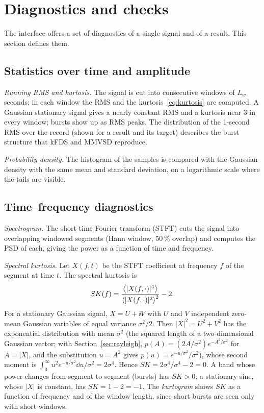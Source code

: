 \section{Diagnostics and checks}\label{sec:diagnostics}

The interface offers a set of diagnostics of a single signal and of a result. This section defines
them.

\subsection{Statistics over time and amplitude}

\emph{Running RMS and kurtosis.} The signal is cut into consecutive windows of $L_w$ seconds; in each
window the RMS and the kurtosis~\eqref{eq:kurtosis} are computed. A Gaussian stationary signal gives a
nearly constant RMS and a kurtosis near 3 in every window; bursts show up as RMS peaks. The
distribution of the 1-second RMS over the record (shown for a result and its target) describes the
burst structure that kFDS and MMVSD reproduce.

\emph{Probability density.} The histogram of the samples is compared with the Gaussian density with
the same mean and standard deviation, on a logarithmic scale where the tails are visible.

\subsection{Time--frequency diagnostics}

\emph{Spectrogram.} The short-time Fourier transform (STFT) cuts the signal into overlapping
windowed segments (Hann window, 50\,\% overlap) and computes the PSD of each, giving the power as a
function of time and frequency.

\emph{Spectral kurtosis.} Let $X(f,t)$ be the STFT coefficient at frequency $f$ of the segment at time
$t$. The spectral kurtosis is
\begin{equation}
  SK(f) = \frac{\left\langle |X(f,\cdot)|^4 \right\rangle}{\left\langle |X(f,\cdot)|^2 \right\rangle^2} - 2 .
\end{equation}
For a stationary Gaussian signal, $X = U + \ii V$ with $U$ and $V$ independent zero-mean Gaussian
variables of equal variance $\sigma^2/2$. Then $|X|^2 = U^2+V^2$ has the exponential distribution with
mean $\sigma^2$ (the squared length of a two-dimensional Gaussian vector; with
Section~\ref{sec:rayleigh}, $p(A) = (2A/\sigma^2)e^{-A^2/\sigma^2}$ for $A = |X|$, and the
substitution $u = A^2$ gives $p(u) = e^{-u/\sigma^2}/\sigma^2$), whose second moment is
$\int_0^\infty u^2e^{-u/\sigma^2}\dd u/\sigma^2 = 2\sigma^4$. Hence $SK = 2\sigma^4/\sigma^4 - 2 = 0$. A
band whose power changes from segment to segment (bursts) has $SK>0$; a stationary sine, whose
$|X|$ is constant, has $SK = 1 - 2 = -1$. The \emph{kurtogram} shows $SK$ as a function of frequency
and of the window length, since short bursts are seen only with short windows.


